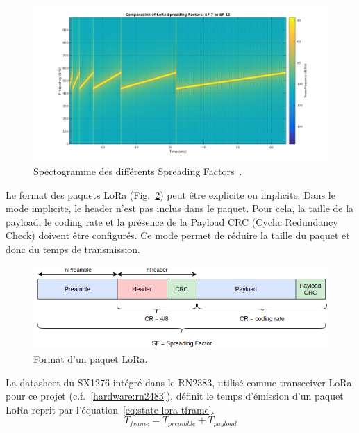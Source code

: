 \begin{figure}[H]
    \centering
    \includegraphics[scale=0.25]{res/pictures/lora-sf.png}
    \caption{Spectogramme des différents Spreading Factors~\cite{ghoslya}.}
    \label{fig:state-sf}
\end{figure}



\vspace{1cm}
Le format des paquets LoRa (Fig.~\ref{fig:state-lora-frame-format}) peut être explicite ou implicite.
Dans le mode implicite, le header n'est pas inclus dans le paquet. Pour cela, la taille de la payload, le coding rate et la présence de la Payload CRC (Cyclic Redundancy Check) doivent être configurés.
Ce mode permet de réduire la taille du paquet et donc du temps de transmission.

\begin{figure}[H]
    \centering
    \includegraphics[scale=0.6]{res/pictures/lora-frame-format.drawio.png}
    \caption{Format d'un paquet LoRa.}
    \label{fig:state-lora-frame-format}
\end{figure}

La datasheet du SX1276 intégré dans le RN2383, utilisé comme transceiver LoRa pour ce projet (c.f.~\ref{hardware:rn2483}), définit le temps d'émission d'un paquet LoRa reprit par l'équation~\ref{eq:state-lora-tframe}.
\begin{equation}\label{eq:state-lora-tframe}
    T_{frame} = T_{preamble} + T_{payload}
\end{equation}

